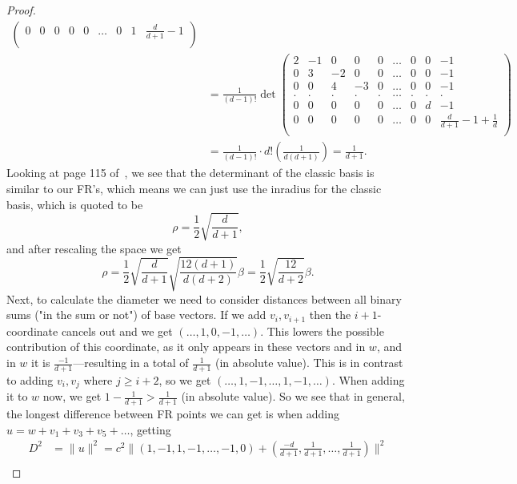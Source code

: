 \begin{proof}
\begin{align*}
\begin{pmatrix}
            0 & 0  &  0 & 0 & 0 &\dots & 0 & 1 & \frac{d}{d+1}-1\\
        \end{pmatrix}\\
        &=\frac{1}{\left(d-1\right)!}\det\begin{pmatrix}
            2 & -1 &  0  & 0 & 0 &\dots & 0 & 0 & -1\\
            0 & 3  &  -2 & 0 & 0 &\dots & 0 & 0 & -1\\
            0 & 0  &  4 & -3 & 0 & \dots & 0 & 0 & -1\\
            . & .  &  . & . & . & \dots & . & . & .\\
            0 & 0  &  0 & 0 & 0 & \dots & 0 & d & -1\\
            0 & 0  &  0 & 0 & 0 &\dots & 0 & 0 & \frac{d}{d+1}-1+\frac{1}{d}\\
        \end{pmatrix}\\
        &=\frac{1}{\left(d-1\right)!}\cdot d!\left(\frac{1}{d\left(d+1\right)}\right)
        =\frac{1}{d+1}.
    \end{align*}    
    Looking at page 115 of~\cite{conway2013sphere}, we see that the determinant of the classic basis is similar to our FR's, which means we can just use the inradius for the classic basis, which is quoted to be
    \[
        \rho = \frac{1}{2}\sqrt{\frac{d}{d+1}},
    \]
    and after rescaling the space we get
    \[
        \rho=\frac{1}{2}\sqrt{\frac{d}{d+1}}\sqrt{\frac{12\left(d+1\right)}{d\left(d+2\right)}}\beta
        =\frac{1}{2}\sqrt{\frac{12}{d+2}}\beta.
    \]
    Next, to calculate the diameter we need to consider distances between all binary sums ("in the sum or not") of base vectors. If we add $v_i,v_{i+1}$ then the $i+1$-coordinate cancels out and we get $\left(\dots,1,0,-1,\dots\right)$. This lowers the possible contribution of this coordinate, as it only appears in these vectors and in $w$, and in $w$ it is $\frac{-1}{d+1}$---resulting in a total of $\frac{1}{d+1}$ (in absolute value). This is in contrast to adding $v_i,v_j$ where $j\geq i+2$, so we get $\left(\dots,1,-1,\dots,1,-1,\dots\right)$. When adding it to $w$ now, we get $1-\frac{1}{d+1}>\frac{1}{d+1}$ (in absolute value). So we see that in general, the longest difference between FR points we can get is when adding $u=w+v_1+v_3+v_5+\dots$, getting
    \begin{align*}
        D^2&=\|u\|^2=c^2\|\left(1,-1,1,-1,\dots,-1,0\right)+\left(\frac{-d}{d+1},\frac{1}{d+1},\dots,\frac{1}{d+1}\right)\|^2\\

\end{align*}
\end{proof}
